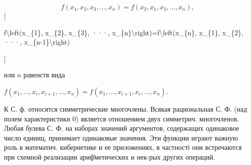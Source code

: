 \documentclass[10pt]{article}
\begin{document}
\[

f\left(x_{1}, x_{2}, x_{3}, \ldots, x_{n}\right)=f\left(x_{2}, x_{1}, x_{3}, \ldots, x_{n}\right),

\][



f\textbackslash left(x\_\{1\}, x\_\{2\}, x\_\{3\}, ···, x\_\{n\}\textbackslash right)=f\textbackslash left(x\_\{n\}, x\_\{1\}, x\_\{2\}, ···, x\_\{n-1\}\textbackslash right)

]



или $n$ равенств вида



$f\left(x_{1}, \ldots, x_{i}, x_{i+1}, \ldots, x_{n}\right)=f\left(x_{1}, \ldots, x_{i+1}, x_{i}, \ldots, x_{n}\right)$.



К С. ф. относятся симметрические многочлены. Всякая рациональная С. Ф. (над полем характеристики 0) является отношением двух симметрич. многочленов. Любая булева С. Ф. на наборах значений аргументов, содержащих одинаковое число единиц, принимает одинаковые значения. Эти функции играют важную роль в математич. кибернетике и ее приложениях, в частності они встречаются при схемной реализации ариф̆метических и нек-рых других операций.
\end{document}

